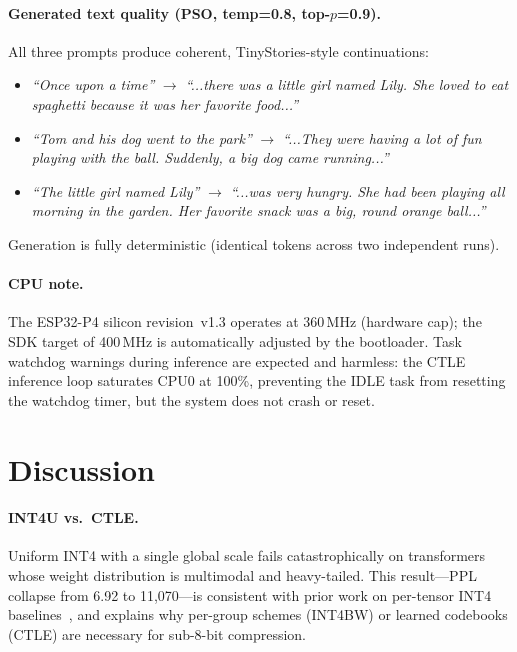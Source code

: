 \documentclass[lettersize,journal]{IEEEtran}
\begin{document}
\paragraph{Generated text quality (PSO, temp=0.8, top-$p$=0.9).}
All three prompts produce coherent, TinyStories-style continuations:
\begin{itemize}
  \item \textit{``Once upon a time''} $\to$
        \textit{``...there was a little girl named Lily. She loved to eat spaghetti
        because it was her favorite food...''}
  \item \textit{``Tom and his dog went to the park''} $\to$
        \textit{``...They were having a lot of fun playing with the ball.
        Suddenly, a big dog came running...''}
  \item \textit{``The little girl named Lily''} $\to$
        \textit{``...was very hungry. She had been playing all morning in the
        garden. Her favorite snack was a big, round orange ball...''}
\end{itemize}
Generation is fully deterministic (identical tokens across two independent runs).

\paragraph{CPU note.}
The ESP32-P4 silicon revision~v1.3 operates at 360\,MHz (hardware cap);
the SDK target of 400\,MHz is automatically adjusted by the bootloader.
Task watchdog warnings during inference are expected and harmless: the CTLE
inference loop saturates CPU0 at 100\%, preventing the IDLE task from resetting
the watchdog timer, but the system does not crash or reset.


\section{Discussion}
\label{sec:discussion}

\paragraph{INT4U vs.\ CTLE.}
Uniform INT4 with a single global scale fails catastrophically on transformers
whose weight distribution is multimodal and heavy-tailed.
This result---PPL collapse from 6.92 to 11{,}070---is consistent with prior work
on per-tensor INT4 baselines~\cite{frantar2023gptq,tomasev2019llm_quantization_survey},
and explains why per-group schemes (INT4BW) or learned codebooks (CTLE) are
necessary for sub-8-bit compression.
\end{document}
